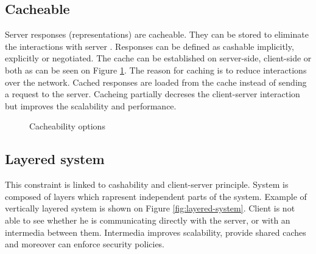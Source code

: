\subsection{Cacheable}

Server responses (representations) are cacheable. They can be stored to eliminate the interactions with server . Responses can be defined as cashable implicitly, explicitly or negotiated. The cache can be established on server-side, client-side or both as can be seen on Figure \ref{fig:cacheability}. The reason for caching is to reduce interactions over the network. Cached responses are loaded from the cache instead of sending a request to the server. 
Cacheing partially decreses the client-server interaction but improves the scalability and performance. 


\begin{figure}[htp] 
\caption{Cacheability options}
\label{fig:cacheability}
\end{figure} 

\subsection{Layered system}

This constraint is linked to cashability and client-server principle. System is composed of layers which rapresent independent parts of the system. Example of vertically layered system is shown on Figure \ref{fig:layered-system}. Client is not able to see whether he is communicating directly with the server, or with an intermedia between them. Intermedia improves scalability, provide shared caches and moreover can enforce security policies.

